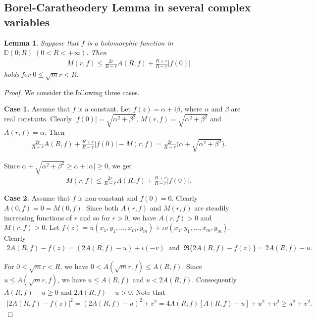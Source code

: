 \documentclass[11pt, reqno]{amsart}
\newtheorem{lem}{Lemma}[section]
\newcommand{\ol}{\overline}
\numberwithin{equation}{section}
\begin{document}
\subsection{\bf{Borel-Caratheodery Lemma in several complex variables}}
\begin{lem}\label{t2.1} Suppose that $f$ is a holomorphic function in $\ol{\mathbb{D}(0;R)}\;(0<R<+\infty)$. Then
\begin{align*}
 M(r,f)\leq \frac{2r}{R-r}A(R,f)+\frac{R+r}{R-r} |f(0)|
\end{align*}
holds for $0\leq \sqrt{m}r< R$.
\end{lem}
\begin{proof} We consider the following three cases.
\vspace{1.2mm}

{\bf Case 1.} Assume that $f$ is a constant. Let $f(z)=\alpha+i\beta$, where $\alpha$ and $\beta$ are real constants. Clearly $|f(0)|=\sqrt{\alpha^{2}+\beta^{2}}$, $M(r,f)=\sqrt{\alpha^{2}+\beta^{2}}$ and $A(r,f)=\alpha$. Then
\begin{align*}
 \frac{2r}{R-r}A(R,f)+\frac{R+r}{R-r}|f(0)|-M(r,f)=\frac{2r}{R-r}\Big(\alpha+\sqrt{\alpha^{2}+\beta^{2}}\Big).
 \end{align*}

Since $\alpha+\sqrt{\alpha^{2}+\beta^{2}}\geq \alpha+|\alpha|\geq 0$, we get
\begin{align*}
M(r,f)\leq \frac{2r}{R-r}A(R,f)+\frac{R+r}{R-r}|f(0)|.
\end{align*}
\vspace{1.2mm}

{\bf Case 2.} Assume that $f$ is non-constant and $f(0)=0$. Clearly $A(0,f)=0=M(0,f)$. Since both $A(r,f)$ and $M(r,f)$ are steadily increasing functions of $r$ and so for $r>0$, we have $A(r,f)>0$ and $M(r,f)>0$. Let $f(z)=u(x_1,y_1,\ldots,x_m,y_m)+\iota v(x_1,y_1,\ldots,x_m,y_m)$. Clearly
\begin{align*}
 2A(R,f)-f(z)=(2A(R,f)-u)+\iota (-v)\;\;\text{and}\;\;\Re\{2A(R,f)-f(z)\}=2A(R,f)-u.
 \end{align*}

For $0<\sqrt{m}r<R$, we have $0<A(\sqrt{m}r,f)\leq A(R,f)$. Since $u\leq A(\sqrt{m}r,f)$, we have $u\leq A(R,f)$ and $u<2A(R,f)$. Consequently $A(R,f)-u\geq 0$ and $2A(R,f)-u>0$. Note that
\begin{align}\label{pd1} 
|2A(R,f)-f(z)|^{2}=(2A(R,f)-u)^{2}+v^{2}=4A(R,f)[A(R,f)-u]+u^{2}+v^{2}\geq u^{2}+v^{2}.
\end{align}


\end{proof}
\end{document}
